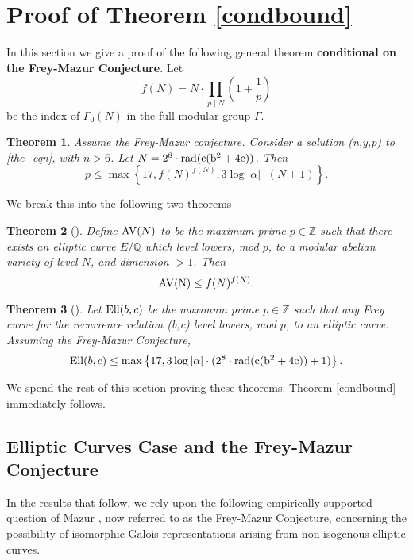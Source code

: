 \documentclass[12pt]{amsart}
\newtheorem{thm}{Theorem}[section]
\theoremstyle{definition}
\def\Q{{\mathbb Q}}
\def\Z{{\mathbb Z}}
\newcommand{\rad}{\rm rad}
\newcommand{\Ell}{\rm{Ell}}
\newcommand{\AV}{\rm{AV}}
\begin{document}
\section{Proof of Theorem \ref{condbound}}\label{genthmproof}

In this section we give a proof of the following general theorem \textbf{conditional on the Frey-Mazur Conjecture}.  Let 
\[f(N) = N \cdot \prod_{p \mid N} \left( 1 + \frac{1}{p} \right) \]
be the index of $\Gamma_0(N)$ in the full modular group $\Gamma$.

\begin{thm}\label{condbound_inplace}
Assume the Frey-Mazur conjecture.  Consider a solution (n,y,p) to \eqref{the_eqn}, with $n > 6$. Let $N = 2^8 \cdot \rad(c(b^2+4c))$. Then 
\[ p \leq \max\left\{17,   f(N)^{f(N)}, 3\log{|\alpha|} \cdot ( N+1)  \right\}. \]

\end{thm}

We break this into the following two theorems

\begin{thm}[]\label{bound_av}
Define ${\AV}(N)$ to be the maximum prime $p \in \Z$ such that there exists an elliptic curve $E/\Q$ which level lowers, mod $p$, to a modular abelian variety of level $N$, and dimension $> 1$.  Then
\[{\AV(N)} \leq f(N)^{f(N)}. \]
\end{thm}

\begin{thm}[]\label{bound_ell}
Let ${\Ell}(b,c)$ be the maximum prime $p \in \Z$ such that any Frey curve for the recurrence relation (b,c) level lowers, mod $p$, to an elliptic curve.  Assuming the Frey-Mazur Conjecture, 
\[{\Ell}(b,c) \leq \max\left\{17, 3\log{|\alpha|} \cdot (2^{8} \cdot \rad(c(b^2+4c))+1) \right\}. \]
\end{thm}


We spend the rest of this section proving these theorems. Theorem \ref{condbound} immediately follows.


\subsection{Elliptic Curves Case and the Frey-Mazur Conjecture}

In the results that follow, we rely upon the following empirically-supported question of Mazur \cite{mazur78}, now referred to as the Frey-Mazur Conjecture, concerning the possibility of isomorphic Galois representations arising from non-isogenous elliptic curves.
\end{document}
